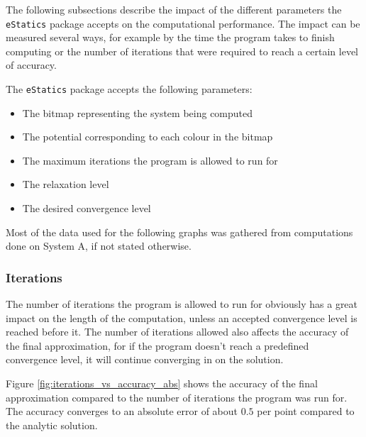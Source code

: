 The following subsections describe the impact of the different parameters the \lstinline|eStatics| package accepts on the computational performance. The impact can be measured several ways, for example by the time the program takes to finish computing or the number of iterations that were required to reach a certain level of accuracy. 

The \lstinline|eStatics| package accepts the following parameters:
\begin{itemize}
	\item The bitmap representing the system being computed
	\item The potential corresponding to each colour in the bitmap
	\item The maximum iterations the program is allowed to run for
	\item The relaxation level
	\item The desired convergence level
\end{itemize}

Most of the data used for the following graphs was gathered from computations done on System A, if not stated otherwise.

\subsubsection{Iterations}
The number of iterations the program is allowed to run for obviously has a great impact on the length of the computation, unless an accepted convergence level is reached before it. The number of iterations allowed also affects the accuracy of the final approximation, for if the program doesn't reach a predefined convergence level, it will continue converging in on the solution. 

Figure \ref{fig:iterations_vs_accuracy_abs} shows the accuracy of the final approximation compared to the number of iterations the program was run for. The accuracy converges to an absolute error of about $0.5$ per point compared to the analytic solution.

